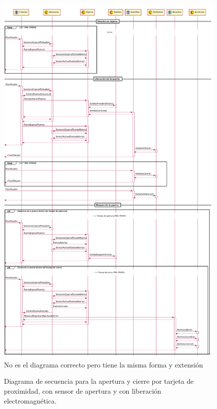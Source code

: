 \begin{figure}[ht]
	\centering
	\includegraphics[width=\textwidth]{Figures/PNK-DS002-A.pdf}
	{\color{red} No es el diagrama correcto pero tiene la misma forma y extensión}
	\caption[Apertura por tarjeta con cerradura electromagnética y sensor]{Diagrama de secuencia para la apertura y cierre por tarjeta de proximidad, con sensor de apertura y con liberación electromagnética.}
	\label{fig:SecuenciaTarjeta}
\end{figure}

